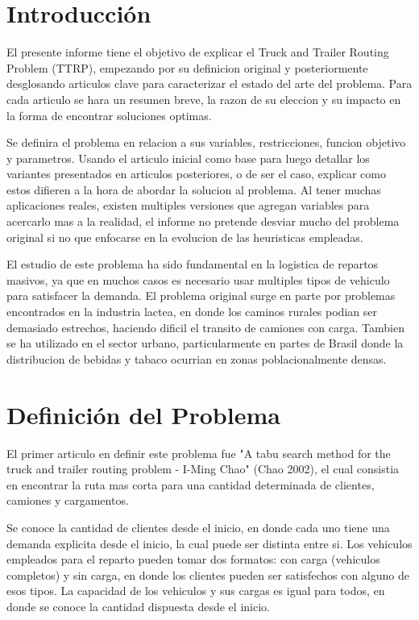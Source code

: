 \documentclass[letter, 10pt]{article}
\begin{document}
\section{Introducci\'on}
El presente informe tiene el objetivo de explicar el Truck and Trailer Routing Problem (TTRP), empezando por su definicion original y
posteriormente desglosando articulos clave para caracterizar el estado del arte del problema. Para cada articulo se hara un resumen breve,
la razon de su eleccion y su impacto en la forma de encontrar soluciones optimas.

Se definira el problema en relacion a sus variables, restricciones, funcion objetivo y parametros. Usando el articulo inicial como
base para luego detallar los variantes presentados en articulos posteriores, o de ser el caso, explicar como estos difieren a la hora
de abordar la solucion al problema. Al tener muchas aplicaciones reales, existen multiples versiones que agregan variables para
acercarlo mas a la realidad, el informe no pretende desviar mucho del problema original si no que enfocarse en la evolucion de las
heuristicas empleadas.

El estudio de este problema ha sido fundamental en la logistica de repartos masivos, ya que en muchos casos es necesario usar multiples
tipos de vehiculo para satisfacer la demanda. El problema original surge en parte por problemas encontrados en la industria lactea, en
donde los caminos rurales podian ser demasiado estrechos, haciendo dificil el transito de camiones con carga. Tambien se ha utilizado en el
sector urbano, particularmente en partes de Brasil donde la distribucion de bebidas y tabaco ocurrian en zonas poblacionalmente densas.

\section{Definici\'on del Problema}
El primer articulo en definir este problema fue "A tabu search method for the truck and trailer routing problem - I-Ming Chao" (Chao 2002),
el cual consistia en encontrar la ruta mas corta para una cantidad determinada de clientes, camiones y cargamentos.

Se conoce la cantidad de clientes desde el inicio, en donde cada uno tiene una demanda explicita desde el inicio, la cual puede ser distinta
entre si. Los vehiculos empleados para el reparto pueden tomar dos formatos: con carga (vehiculos completos) y sin carga, en donde los clientes
pueden ser satisfechos con alguno de esos tipos. La capacidad de los vehiculos y sus cargas es igual para todos, en donde se conoce la cantidad
dispuesta desde el inicio.
\end{document}
